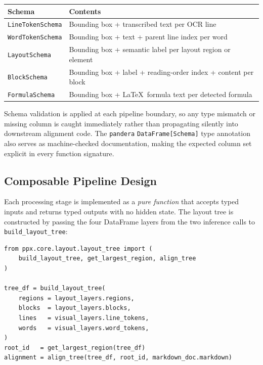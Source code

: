 \documentclass{article}
\theoremstyle{definition}
\begin{document}
\medskip
\begin{center}
  \small
  \begin{tabular}{ll}
    \toprule
    Schema                   & Contents                                                       \\
    \midrule
    \texttt{LineTokenSchema} & Bounding box + transcribed text per OCR line                   \\
    \texttt{WordTokenSchema} & Bounding box + text + parent line index per word               \\
    \texttt{LayoutSchema}    & Bounding box + semantic label per layout region or element     \\
    \texttt{BlockSchema}     & Bounding box + label + reading-order index + content per block \\
    \texttt{FormulaSchema}   & Bounding box + \LaTeX\ formula text per detected formula       \\
    \bottomrule
  \end{tabular}
\end{center}
\medskip

Schema validation is applied at each pipeline boundary, so any type mismatch
or missing column is caught immediately rather than propagating silently into
downstream alignment code.  The \texttt{pandera} \texttt{DataFrame[Schema]}
type annotation also serves as machine-checked documentation, making the
expected column set explicit in every function signature.

\subsection{Composable Pipeline Design}
\label{sec:composable}

Each processing stage is implemented as a \emph{pure function} that accepts
typed inputs and returns typed outputs with no hidden state.  The layout tree
is constructed by passing the four DataFrame layers from the two inference
calls to \texttt{build\_layout\_tree}:

\begin{lstlisting}
from ppx.core.layout.layout_tree import (
    build_layout_tree, get_largest_region, align_tree
)

tree_df = build_layout_tree(
    regions = layout_layers.regions,
    blocks  = layout_layers.blocks,
    lines   = visual_layers.line_tokens,
    words   = visual_layers.word_tokens,
)
root_id   = get_largest_region(tree_df)
alignment = align_tree(tree_df, root_id, markdown_doc.markdown)
\end{lstlisting}
\end{document}
